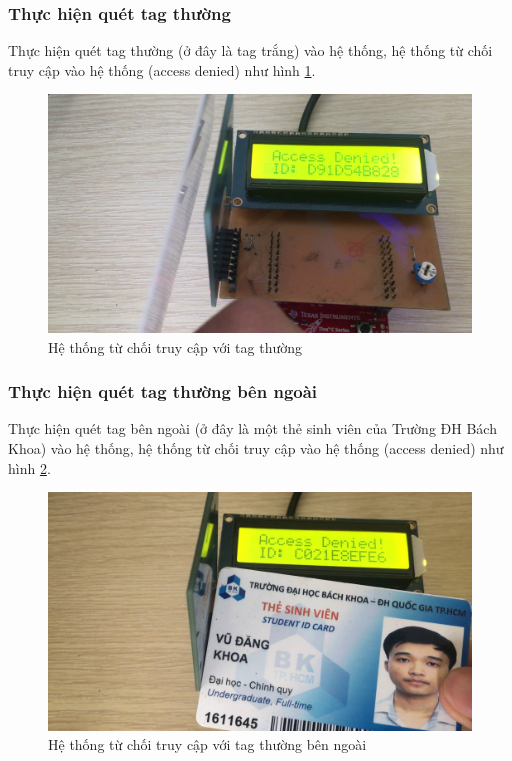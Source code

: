 \subsubsection{Thực hiện quét tag thường}
Thực hiện quét tag thường (ở đây là tag trắng) vào hệ thống, hệ thống từ chối truy cập vào hệ thống (access denied) như hình \ref{fig:card}.
\begin{figure}[ht]
\centering
\includegraphics[scale=0.3]{images/card.jpg}
\caption{Hệ thống từ chối truy cập với tag thường}
\label{fig:card}
\end{figure}

\subsubsection{Thực hiện quét tag thường bên ngoài}
Thực hiện quét tag bên ngoài (ở đây là một thẻ sinh viên của Trường ĐH Bách Khoa) vào hệ thống, hệ thống từ chối truy cập vào hệ thống (access denied) như hình \ref{fig:student_card}.
\begin{figure}[ht]
\centering
\includegraphics[scale=0.3]{images/student_card.jpg}
\caption{Hệ thống từ chối truy cập với tag thường bên ngoài}
\label{fig:student_card}
\end{figure}

